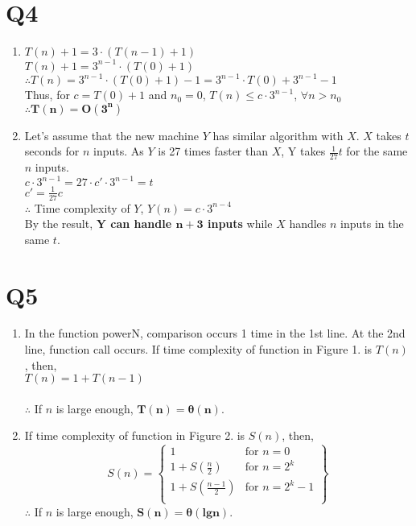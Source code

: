 \documentclass[12pt,a4paper]{article}
\begin{document}
\section{Q4}
\begin{enumerate}[label=(\arabic*)]
    \item
        $T(n)+1=3\cdot(T(n-1)+1)$\\
        $T(n)+1=3^{n-1}\cdot(T(0)+1)$\\
        $\therefore T(n)=3^{n-1}\cdot(T(0)+1)-1 = 3^{n-1}\cdot T(0)+3^{n-1}-1$\\
        Thus, for $c=T(0)+1$ and $n_0=0$, $T(n)\leq c\cdot 3^{n-1}$, $\forall n>n_0$\\
        $\mathbf{\therefore T(n)=O(3^n)}$

    \item
        Let's assume that the new machine $Y$ has similar algorithm with $X$.
        $X$ takes $t$ seconds for $n$ inputs. As $Y$ is 27 times faster than $X$, Y takes $\frac{1}{27}t$ for the same $n$ inputs.\\
        $c\cdot 3^{n-1} = 27\cdot c'\cdot 3^{n-1}=t$\\
        $c'=\frac{1}{27}c$\\
        $\therefore$ Time complexity of $Y$, $Y(n)=c\cdot 3^{n-4}$\\
        By the result, \textbf{$\mathbf{Y}$ can handle $\mathbf{n+3}$ inputs} while $X$ handles $n$ inputs in the same $t$.

\end{enumerate}

\section{Q5}
\begin{enumerate}[label=(\arabic*)]
    \item
        In the function powerN, comparison occurs 1 time in the 1st line.
        At the 2nd line, function call occurs.
        If time complexity of function in Figure 1. is $T(n)$, then, \\
        $T(n)=1+T(n-1)$\\
        \\
        $\therefore$ If $n$ is large enough, $\mathbf{T(n)=\theta(n)}$.

    \item
        If time complexity of function in Figure 2. is $S(n)$, then,\\
        \[
            S(n) = \left.
            \begin{cases}
                1 & \text{for } n=0\\
                1+S(\frac{n}{2}) & \text{for } n=2^k\\
                1+S(\frac{n-1}{2}) & \text{for } n=2^k-1\\
            \end{cases}
            \right\}
        \]
        $\therefore$ If $n$ is large enough, $\mathbf{S(n)=\theta(lgn)}$.
        
\end{enumerate}
\end{document}
